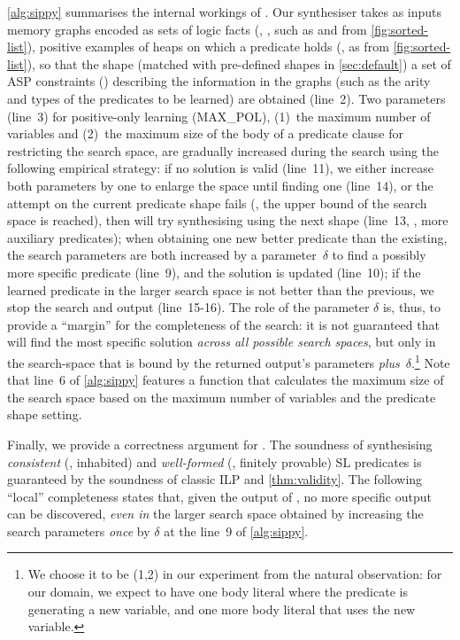 \autoref{alg:sippy} summarises the internal workings of \tool.
%
Our synthesiser takes as inputs memory graphs encoded as sets of logic
facts (\eg, , such as  and
 from \autoref{fig:sorted-list}), positive examples of
heaps on which a predicate holds (\eg,  as 
from \autoref{fig:sorted-list}), so that the shape (matched with
pre-defined shapes in \autoref{sec:default}) a set of ASP constraints
() describing the information in the graphs (such as
the arity and types of the predicates to be learned) are obtained
(line~2).
%
Two parameters (line~3) for positive-only learning (MAX\_POL), (1)~the maximum number of
variables and (2)~the maximum size of the body of a predicate clause
for restricting the search space, are gradually increased during the
search using the following empirical strategy:
%
if no solution is valid (line~11), we either increase both parameters
by one to enlarge the space until finding one (line~14), or the
attempt on the current predicate shape fails (\ie, the upper bound of
the search space is reached), then
\tool will try synthesising using the next shape (line~13, \ie, more auxiliary predicates);
%
when obtaining one new better predicate than the existing, the search
parameters are both increased by a parameter~$\delta$ to find a
possibly more specific predicate (line~9), and the solution is
updated (line~10); if the learned predicate in the larger search space
is not better than the previous, we stop the search and output
(line~15-16).
%
The role of the parameter $\delta$ is, thus, to provide a ``margin''
for the completeness of the search: it is not guaranteed that \tool
will find the most specific solution \emph{across all possible search
  spaces}, but only in the search-space that is bound by the returned
output's parameters \emph{plus}~$\delta$.\footnote{We choose it to be (1,2) in our experiment from the natural observation: for our domain, we expect to have one body literal where the predicate is generating a new variable, and one more body literal that uses the new variable.}
%
Note that line~6 of \autoref{alg:sippy} features a function
 that calculates the maximum size of the search space based on the maximum number of variables and the predicate shape setting.

Finally, we provide a correctness argument for \tool. The soundness of
synthesising \emph{consistent} (\ie, inhabited) and \emph{well-formed}
(\ie, finitely provable) SL predicates is guaranteed by the soundness
of classic ILP and \autoref{thm:validity}. The following ``local''
completeness states that, given the output of \tool, no more specific
output can be discovered, \emph{even in} the larger search space
obtained by increasing the search parameters \emph{once} by $\delta$
at the line~9 of \autoref{alg:sippy}.

